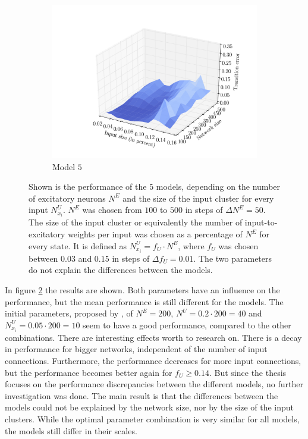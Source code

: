 \begin{figure}[p]
\begin{subfigure}{0.48\textwidth}
        \includegraphics[width=\textwidth]{results/mc1_distances_size_inputs_4}
        \caption{Model $5$}
        \label{fig:mc1-size-4}
    \end{subfigure}
    \hfill
    \caption[Size of the network and size of the input cluster]{Shown is the performance of the $5$ models, depending on the number of excitatory neurons $N^E$ and the size of the input cluster   for every input $N^U_{x_i}$. $N^E$ was chosen from $100$ to $500$ in steps of $\Delta N^E = 50$. The size of the input cluster or equivalently the number of input-to-excitatory weights per input was chosen as a percentage of $N^E$ for every state. It is defined as $N^U_{x_i} = f_U \cdot N^E$, where $f_U$ was chosen between $0.03$ and $0.15$ in steps of $\Delta f_U = 0.01$. The two parameters do not explain the differences between the models.}
    \label{fig:mc1-size}
\end{figure}

In figure \ref{fig:mc1-size} the results are shown. Both parameters have an influence on the performance, but the mean performance is still different for the models. The initial parameters, proposed by \textcite{hartmann2015s}, of $N^E = 200$, $N^U = 0.2 \cdot 200 = 40$ and $N^U_{x_i} = 0.05 \cdot 200 = 10$ seem to have a good performance, compared to the other combinations. There are interesting effects worth to research on. There is a decay in performance for bigger networks, independent of the number of input connections. Furthermore, the performance decreases for more input connections, but the performance becomes better again for $f_U \ge 0.14$. But since the thesis focuses on the performance discrepancies between the different models, no further investigation was done. The main result is that the differences between the models could not be explained by the network size, nor by the size of the input clusters. While the optimal parameter combination is very similar for all models, the models still differ in their scales.

